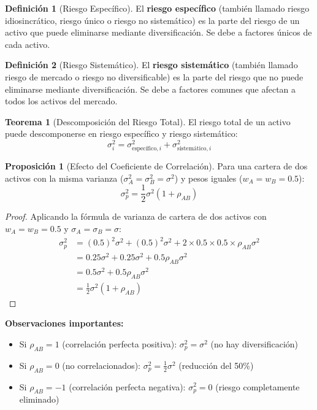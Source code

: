 \documentclass[12pt,a4paper]{article}
\theoremstyle{definition}
\newtheorem{definicion}{Definición}[section]
\newtheorem{teorema}{Teorema}[section]
\newtheorem{proposicion}{Proposición}[section]
\begin{document}
\begin{definicion}[Riesgo Específico]
El \textbf{riesgo específico} (también llamado riesgo idiosincrático, riesgo único o riesgo no sistemático) es la parte del riesgo de un activo que puede eliminarse mediante diversificación. Se debe a factores únicos de cada activo.
\end{definicion}

\begin{definicion}[Riesgo Sistemático]
El \textbf{riesgo sistemático} (también llamado riesgo de mercado o riesgo no diversificable) es la parte del riesgo que no puede eliminarse mediante diversificación. Se debe a factores comunes que afectan a todos los activos del mercado.
\end{definicion}

\begin{teorema}[Descomposición del Riesgo Total]
El riesgo total de un activo puede descomponerse en riesgo específico y riesgo sistemático:
\begin{equation}
\sigma_i^2 = \sigma_{\text{específico},i}^2 + \sigma_{\text{sistemático},i}^2
\end{equation}
\end{teorema}

\begin{proposicion}[Efecto del Coeficiente de Correlación]
Para una cartera de dos activos con la misma varianza ($\sigma_A^2 = \sigma_B^2 = \sigma^2$) y pesos iguales ($w_A = w_B = 0.5$):
\begin{equation}
\sigma_p^2 = \frac{1}{2}\sigma^2(1 + \rho_{AB})
\end{equation}
\end{proposicion}

\begin{proof}
Aplicando la fórmula de varianza de cartera de dos activos con $w_A = w_B = 0.5$ y $\sigma_A = \sigma_B = \sigma$:
\begin{align*}
\sigma_p^2 &= (0.5)^2 \sigma^2 + (0.5)^2 \sigma^2 + 2 \times 0.5 \times 0.5 \times \rho_{AB} \sigma^2 \\
&= 0.25\sigma^2 + 0.25\sigma^2 + 0.5 \rho_{AB} \sigma^2 \\
&= 0.5\sigma^2 + 0.5 \rho_{AB} \sigma^2 \\
&= \frac{1}{2}\sigma^2(1 + \rho_{AB})
\end{align*}
\end{proof}

\textbf{Observaciones importantes:}
\begin{itemize}
\item Si $\rho_{AB} = 1$ (correlación perfecta positiva): $\sigma_p^2 = \sigma^2$ (no hay diversificación)
\item Si $\rho_{AB} = 0$ (no correlacionados): $\sigma_p^2 = \frac{1}{2}\sigma^2$ (reducción del 50\%)
\item Si $\rho_{AB} = -1$ (correlación perfecta negativa): $\sigma_p^2 = 0$ (riesgo completamente eliminado)
\end{itemize}
\end{document}
